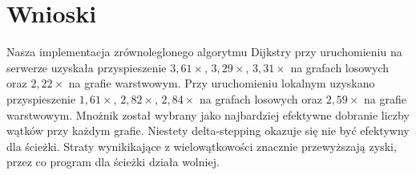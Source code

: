 \documentclass[12pt, a4paper]{article}
\begin{document}
\section{Wnioski}
Nasza implementacja zrównoleglonego algorytmu Dijkstry przy uruchomieniu na serwerze uzyskała przyspieszenie $3{,}61\times$, $3{,}29\times$, $3{,}31\times$ na grafach losowych oraz $2{,}22\times$ na grafie warstwowym. Przy uruchomieniu lokalnym uzyskano przyspieszenie $1{,}61\times$, $2{,}82\times$, $2{,}84\times$ na grafach losowych
oraz $2{,}59\times$ na grafie warstwowym. Mnożnik został wybrany jako najbardziej efektywne dobranie liczby wątków przy każdym grafie. Niestety delta-stepping okazuje się nie być efektywny dla ścieżki. Straty wynikikające z wielowątkowości znacznie przewyższają zyski, przez co program dla ścieżki działa wolniej.
\end{document}
